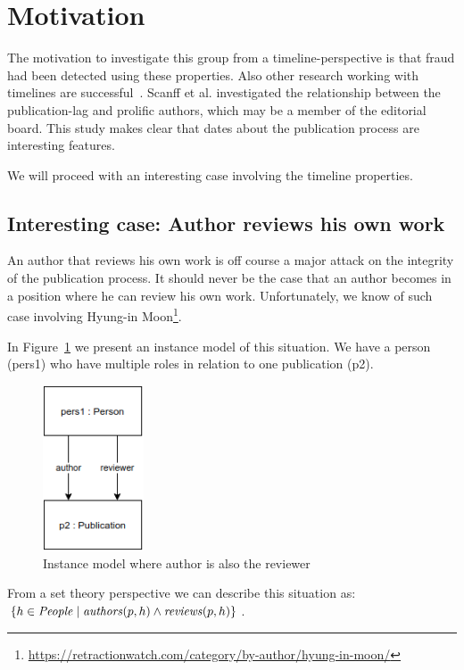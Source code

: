 \documentclass{ou-report}
\begin{document}
\section{Motivation}
The motivation to investigate this group from a timeline-perspective is that
fraud had been detected using these properties. Also other research working with
timelines are successful~\cite{SNCMBL2021}. Scanff et al. investigated the 
relationship between the publication-lag and prolific authors, which may be a 
member of the editorial board. This study makes clear that dates about the
publication process are interesting features.  

We will proceed with an interesting case involving the timeline properties.
\subsection{Interesting case: Author reviews his own work}
\label{interesting_case:author_reviews_own_work}
An author that reviews his own work is off course a major attack on the
integrity of the publication process. It should never be the case that an author
becomes in a position where he can review his own work. Unfortunately, we know
of such case involving Hyung-in
Moon\footnote{\url{https://retractionwatch.com/category/by-author/hyung-in-moon/}}. 

In Figure~\ref{fig:air} we present an instance model of this situation. We have 
a person (pers1) who have multiple roles in relation to one publication (p2).

\begin{figure}[H]
\centering
\includegraphics[width=3cm]{images/author_is_reviewer.drawio.png}
\caption{Instance model where author is also the reviewer}
\label{fig:air}
\end{figure}
From a set theory perspective we can describe this situation as: 
$\{h \in \mathit{People} \mid \mathit{authors}(p, h) \land \mathit{reviews}(p, h)\}$.
\end{document}

